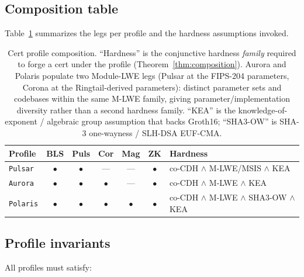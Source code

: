 \subsection{Composition table}

Table~\ref{tab:profiles} summarizes the legs per profile and the
hardness assumptions invoked.

\begin{table}[ht]
\centering
\small
\begin{tabular}{@{}lcccccl@{}}
\toprule
\textbf{Profile} & \textbf{BLS} & \textbf{Puls} & \textbf{Cor} & \textbf{Mag} & \textbf{ZK} & \textbf{Hardness} \\
\midrule
\texttt{Pulsar}  & $\bullet$ & $\bullet$ & --- & --- & $\bullet$ & co-CDH $\wedge$ M-LWE/MSIS $\wedge$ KEA \\
\texttt{Aurora}  & $\bullet$ & $\bullet$ & $\bullet$ & --- & $\bullet$ & co-CDH $\wedge$ M-LWE $\wedge$ KEA \\
\texttt{Polaris} & $\bullet$ & $\bullet$ & $\bullet$ & $\bullet$ & $\bullet$ & co-CDH $\wedge$ M-LWE $\wedge$ SHA3-OW $\wedge$ KEA \\
\bottomrule
\end{tabular}
\caption{Cert profile composition. ``Hardness'' is the conjunctive
hardness \emph{family} required to forge a cert under the profile
(Theorem~\ref{thm:composition}). Aurora and Polaris populate two
Module-LWE legs (Pulsar at the FIPS-204 parameters, Corona at the
Ringtail-derived parameters): distinct parameter sets and codebases
within the same M-LWE family, giving parameter/implementation
diversity rather than a second hardness family. ``KEA'' is the
knowledge-of-exponent / algebraic group assumption that backs
Groth16; ``SHA3-OW'' is SHA-3 one-wayness / SLH-DSA EUF-CMA.}
\label{tab:profiles}
\end{table}

\subsection{Profile invariants}

All profiles must satisfy:

